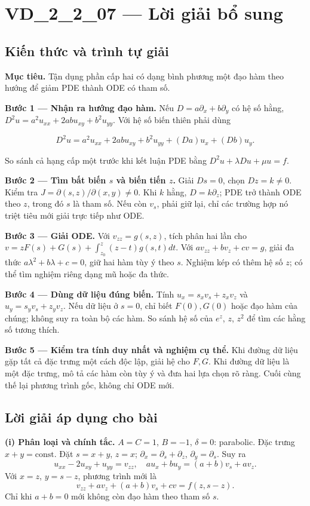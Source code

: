 \documentclass[10pt,a4paper]{article}
\begin{document}
\section*{VD\_2\_2\_07 — Lời giải bổ sung}
\subsection*{Kiến thức và trình tự giải}
\textbf{Mục tiêu.} Tận dụng phần cấp hai có dạng bình phương một đạo hàm theo hướng để giảm PDE thành ODE có tham số.

\textbf{Bước 1 — Nhận ra hướng đạo hàm.} Nếu $D=a\partial_x+b\partial_y$ có hệ số hằng, $D^2u=a^2u_{xx}+2ab u_{xy}+b^2u_{yy}$. Với hệ số biến thiên phải dùng


\[
D^2u=a^2u_{xx}+2ab u_{xy}+b^2u_{yy}+(Da)u_x+(Db)u_y.
\]


So sánh cả hạng cấp một trước khi kết luận PDE bằng $D^2u+\lambda Du+\mu u=f$.

\textbf{Bước 2 — Tìm bất biến $s$ và biến tiến $z$.} Giải $Ds=0$, chọn $Dz=k\ne0$. Kiểm tra $J=\partial(s,z)/\partial(x,y)\ne0$. Khi $k$ hằng, $D=k\partial_z$; PDE trở thành ODE theo $z$, trong đó $s$ là tham số. Nếu còn $v_s$, phải giữ lại, chỉ các trường hợp nó triệt tiêu mới giải trực tiếp như ODE.

\textbf{Bước 3 — Giải ODE.} Với $v_{zz}=g(s,z)$, tích phân hai lần cho $v=zF(s)+G(s)+\int_{z_0}^z(z-t)g(s,t)dt$. Với $a v_{zz}+b v_z+c v=g$, giải đa thức $a\lambda^2+b\lambda+c=0$, giữ hai hàm tùy ý theo $s$. Nghiệm kép có thêm hệ số $z$; có thể tìm nghiệm riêng dạng mũ hoặc đa thức.

\textbf{Bước 4 — Dùng dữ liệu đúng biến.} Tính $u_x=s_xv_s+z_xv_z$ và $u_y=s_yv_s+z_yv_z$. Nếu dữ liệu ở $s=0$, chỉ biết $F(0),G(0)$ hoặc đạo hàm của chúng; không suy ra toàn bộ các hàm. So sánh hệ số của $e^z$, $z$, $z^2$ để tìm các hằng số tương thích.

\textbf{Bước 5 — Kiểm tra tính duy nhất và nghiệm cụ thể.} Khi đường dữ liệu gặp tất cả đặc trưng một cách độc lập, giải hệ cho $F,G$. Khi đường dữ liệu là một đặc trưng, mô tả các hàm còn tùy ý và đưa hai lựa chọn rõ ràng. Cuối cùng thế lại phương trình gốc, không chỉ ODE mới.
\subsection*{Lời giải áp dụng cho bài}
\textbf{(i) Phân loại và chính tắc.} $A=C=1$, $B=-1$, $\delta=0$: parabolic. Đặc trưng $x+y=\mathrm{const}$. Đặt $s=x+y$, $z=x$; $\partial_x=\partial_s+\partial_z$, $\partial_y=\partial_s$. Suy ra
\[u_{xx}-2u_{xy}+u_{yy}=v_{zz},\quad au_x+bu_y=(a+b)v_s+av_z.\]
Với $x=z$, $y=s-z$, phương trình mới là
\[\boxed{v_{zz}+av_z+(a+b)v_s+cv=f(z,s-z).}\]
Chỉ khi $a+b=0$ mới không còn đạo hàm theo tham số $s$.
\end{document}
